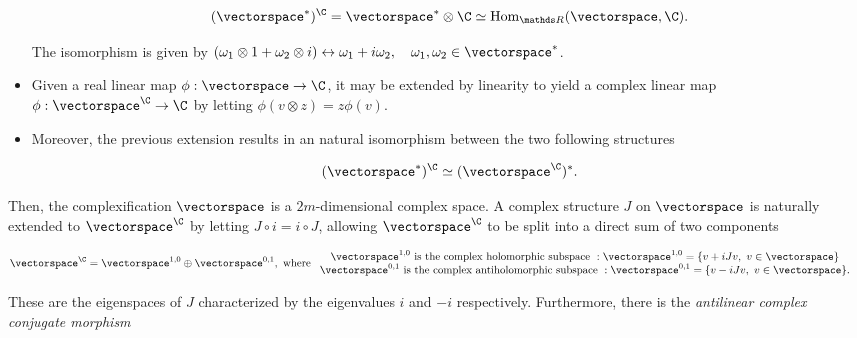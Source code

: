 \documentclass{homework}
\begin{document}
\begin{remark}
\begin{itemize}
        $$
            (\vectorspace^{*})^\C = {\vectorspace^{*}} \otimes \C \simeq \textnormal{Hom}_{\R}(\vectorspace, \C).
        $$
        
        The isomorphism is given by $(\omega_1 \otimes 1 + \omega_2 \otimes i) \leftrightarrow \omega_1 + i\omega_2, \quad \omega_1, \omega_2 \in \vectorspace^{*}$. 
        
        \item Given a real linear map $\phi : \vectorspace \rightarrow \C$, it may be extended by linearity to yield a complex linear map $\phi: \vectorspace^\C \rightarrow \C$ by letting $\phi(v \otimes z) = z \phi(v)$. 
        
        \item Moreover, the previous extension results in an natural isomorphism between the two following structures
        
        \begin{equation*}
            (\vectorspace^{*})^\C \simeq (\vectorspace^\C)^{*}. 
        \end{equation*}
    \end{itemize}
    
\end{remark}

\blanky \bigbreak

Then, the complexification $\vectorspace$ is a $2m$-dimensional complex space. A complex structure $J$ on $\vectorspace$ is naturally extended to $\vectorspace^\C$ by letting $J \circ i = i \circ J$, allowing $\vectorspace^\C$ to be split into a direct sum of two components

\begin{equation} \label{Complex_Manifolds_holo_antiholo_structures}
\begin{split}
    &\vectorspace^\C = \vectorspace^{1,0} \oplus \vectorspace^{0,1}, \textnormal{ where }\begin{array}{cc}
         \textnormal{$\vectorspace^{1,0}$ is the complex holomorphic subspace }: \vectorspace^{1,0} = \{v + i J v, \blanky v \in \vectorspace\}  \\
         \textnormal{$\vectorspace^{0,1}$ is the complex antiholomorphic subspace }: \vectorspace^{0,1} = \{v - i J v, \blanky v \in \vectorspace\}.
    \end{array}
\end{split}
\end{equation}

These are the eigenspaces of $J$ characterized by the eigenvalues $i$ and $-i$ respectively. Furthermore, there is the \textit{antilinear complex conjugate morphism}  
\end{document}
